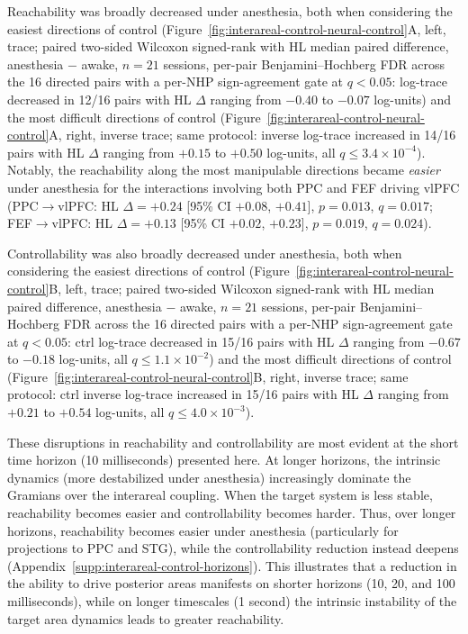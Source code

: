 Reachability was broadly decreased under anesthesia, both when considering the easiest directions of control (Figure~\ref{fig:interareal-control-neural-control}A, left, trace; paired two-sided Wilcoxon signed-rank with HL median paired difference, anesthesia $-$ awake, $n=21$ sessions, per-pair Benjamini--Hochberg FDR across the 16 directed pairs with a per-NHP sign-agreement gate at $q<0.05$: log-trace decreased in 12/16 pairs with HL $\Delta$ ranging from $-0.40$ to $-0.07$ log-units) and the most difficult directions of control (Figure~\ref{fig:interareal-control-neural-control}A, right, inverse trace; same protocol: inverse log-trace increased in 14/16 pairs with HL $\Delta$ ranging from $+0.15$ to $+0.50$ log-units, all $q\leq 3.4\!\times\!10^{-4}$). Notably, the reachability along the most manipulable directions became \textit{easier} under anesthesia for the interactions involving both PPC and FEF driving vlPFC (PPC$\to$vlPFC: HL $\Delta=+0.24$ [95\% CI $+0.08$, $+0.41$], $p=0.013$, $q=0.017$; FEF$\to$vlPFC: HL $\Delta=+0.13$ [95\% CI $+0.02$, $+0.23$], $p=0.019$, $q=0.024$).

Controllability was also broadly decreased under anesthesia, both when considering the easiest directions of control (Figure~\ref{fig:interareal-control-neural-control}B, left, trace; paired two-sided Wilcoxon signed-rank with HL median paired difference, anesthesia $-$ awake, $n=21$ sessions, per-pair Benjamini--Hochberg FDR across the 16 directed pairs with a per-NHP sign-agreement gate at $q<0.05$: ctrl log-trace decreased in 15/16 pairs with HL $\Delta$ ranging from $-0.67$ to $-0.18$ log-units, all $q\leq 1.1\!\times\!10^{-2}$) and the most difficult directions of control (Figure~\ref{fig:interareal-control-neural-control}B, right, inverse trace; same protocol: ctrl inverse log-trace increased in 15/16 pairs with HL $\Delta$ ranging from $+0.21$ to $+0.54$ log-units, all $q\leq 4.0\!\times\!10^{-3}$).

These disruptions in reachability and controllability are most evident at the short time horizon (10 milliseconds) presented here. At longer horizons, the intrinsic dynamics (more destabilized under anesthesia) increasingly dominate the Gramians over the interareal coupling. When the target system is less stable, reachability becomes easier and controllability becomes harder. Thus, over longer horizons, reachability becomes easier under anesthesia (particularly for projections to PPC and STG), while the controllability reduction instead deepens (Appendix~\ref{supp:interareal-control-horizons}). This illustrates that a reduction in the ability to drive posterior areas manifests on shorter horizons (10, 20, and 100 milliseconds), while on longer timescales (1 second) the intrinsic instability of the target area dynamics leads to greater reachability.

